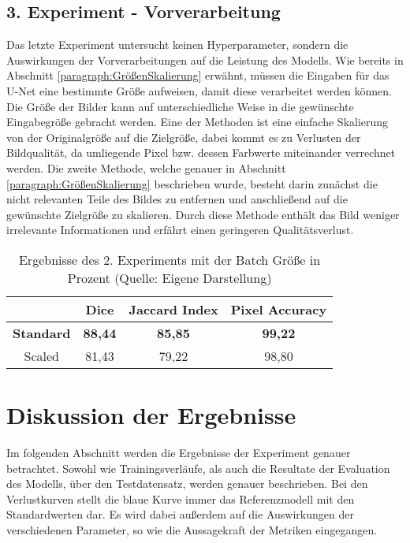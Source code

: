 \subsection{3. Experiment - Vorverarbeitung}
\label{subsec:3.Experiment-Vorverarbeitung}
Das letzte Experiment untersucht keinen Hyperparameter, sondern die Auswirkungen der Vorverarbeitungen auf die Leistung des \gls{Modell}s. Wie bereits in Abschnitt \ref{paragraph:GrößenSkalierung} erwähnt, müssen die Eingaben für das U-Net eine bestimmte Größe aufweisen, damit diese verarbeitet werden können. Die Größe der Bilder kann auf unterschiedliche Weise in die gewünschte Eingabegröße gebracht werden. Eine der Methoden ist eine einfache Skalierung von der Originalgröße auf die Zielgröße, dabei kommt es zu Verlusten der Bildqualität, da umliegende Pixel bzw. dessen Farbwerte miteinander verrechnet werden. Die zweite Methode, welche genauer in Abschnitt \ref{paragraph:GrößenSkalierung} beschrieben wurde, besteht darin zunächst die nicht relevanten Teile des Bildes zu entfernen und anschließend auf die gewünschte Zielgröße zu skalieren. Durch diese Methode enthält das Bild weniger irrelevante Informationen und erfährt einen geringeren Qualitätsverlust. 
\begin{table}[!h]

	\centering
	\begin{tabular}{|c|c|c|c|}
		\hline
		& Dice & Jaccard Index & Pixel Accuracy \\
		\hline
		\textbf{Standard}& \textbf{88,44} 	& \textbf{85,85}  	& \textbf{99,22}  \\
		\hline
		Scaled		& 81,43  	& 79,22 	& 98,80 \\
		\hline
	\end{tabular}
	\caption{Ergebnisse des 2. Experiments mit der Batch Größe in Prozent (Quelle: Eigene Darstellung)}
	\label{table:3.ExperimentErgebnisse}
\end{table}

\section{Diskussion der Ergebnisse}
Im folgenden Abschnitt werden die Ergebnisse der Experiment genauer betrachtet. Sowohl wie Trainingsverläufe, als auch die Resultate der Evaluation des \gls{Modell}s, über den Testdatensatz, werden genauer beschrieben. Bei den Verlustkurven stellt die blaue Kurve immer das Referenzmodell mit den Standardwerten dar. Es wird dabei außerdem auf die Auswirkungen der verschiedenen Parameter, so wie die Aussagekraft der Metriken eingegangen. 

